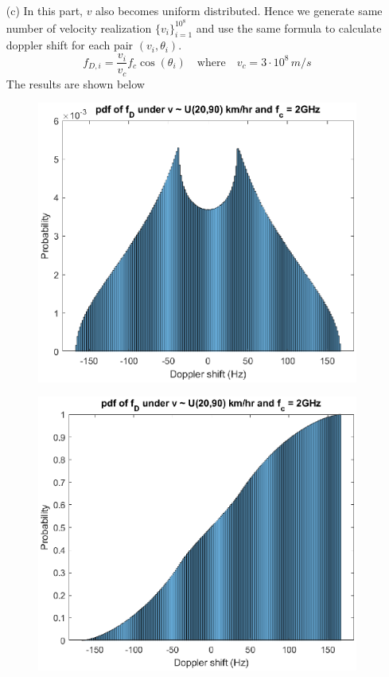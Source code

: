 \begin{itemize}
    \item[(c)] In this part, $v$ also becomes uniform distributed. Hence we generate same number of velocity realization $\{v_i\}_{i=1}^{10^8}$
    and use the same formula to calculate doppler shift for each pair $(v_i, \theta_i)$. 
    \begin{equation*}
        f_{D, i} = \frac{v_i}{v_c} f_c \cos\left(\theta_i\right) \quad \text{where} \quad v_c = 3 \cdot 10^8 \, m/s
    \end{equation*}
    The results are shown below
    \begin{figure}[H]
        \centering
        \includegraphics[scale = 0.8]{c_pdf.eps}
    \end{figure}
    \begin{figure}[H]
        \centering
        \includegraphics[scale = 0.8]{c_cdf.eps}

\end{figure}
\end{itemize}
